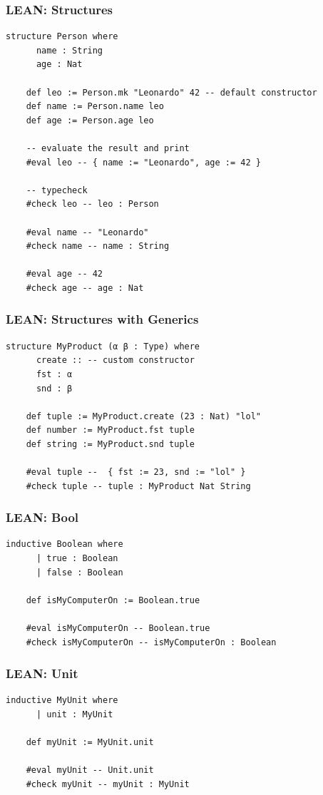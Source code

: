 \documentclass{beamer}
\begin{document}
\begin{frame}[fragile]
  \frametitle{LEAN: Structures}

  \begin{lstlisting}[language=lean]
    structure Person where
      name : String
      age : Nat

    def leo := Person.mk "Leonardo" 42 -- default constructor
    def name := Person.name leo
    def age := Person.age leo

    -- evaluate the result and print
    #eval leo -- { name := "Leonardo", age := 42 }

    -- typecheck
    #check leo -- leo : Person

    #eval name -- "Leonardo"
    #check name -- name : String

    #eval age -- 42
    #check age -- age : Nat
  \end{lstlisting}
\end{frame}

\begin{frame}[fragile]
  \frametitle{LEAN: Structures with Generics}

  \begin{lstlisting}[language=lean]
    structure MyProduct (α β : Type) where
      create :: -- custom constructor
      fst : α
      snd : β

    def tuple := MyProduct.create (23 : Nat) "lol"
    def number := MyProduct.fst tuple
    def string := MyProduct.snd tuple

    #eval tuple --  { fst := 23, snd := "lol" }
    #check tuple -- tuple : MyProduct Nat String
  \end{lstlisting}
\end{frame}

\begin{frame}[fragile]
  \frametitle{LEAN: Bool}

  \begin{lstlisting}[language=lean]
    inductive Boolean where
      | true : Boolean
      | false : Boolean

    def isMyComputerOn := Boolean.true

    #eval isMyComputerOn -- Boolean.true
    #check isMyComputerOn -- isMyComputerOn : Boolean
  \end{lstlisting}
\end{frame}

\begin{frame}[fragile]
  \frametitle{LEAN: Unit}

  \begin{lstlisting}[language=lean]
    inductive MyUnit where
      | unit : MyUnit

    def myUnit := MyUnit.unit

    #eval myUnit -- Unit.unit
    #check myUnit -- myUnit : MyUnit
  \end{lstlisting}
\end{frame}
\end{document}
